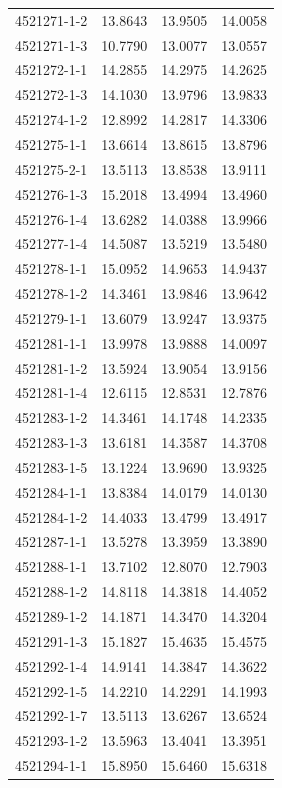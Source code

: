 \begin{longtable}{lrrr}
4521271-1-2 & 13.8643 & 13.9505 & 14.0058 \\
4521271-1-3 & 10.7790 & 13.0077 & 13.0557 \\
4521272-1-1 & 14.2855 & 14.2975 & 14.2625 \\
4521272-1-3 & 14.1030 & 13.9796 & 13.9833 \\
4521274-1-2 & 12.8992 & 14.2817 & 14.3306 \\
4521275-1-1 & 13.6614 & 13.8615 & 13.8796 \\
4521275-2-1 & 13.5113 & 13.8538 & 13.9111 \\
4521276-1-3 & 15.2018 & 13.4994 & 13.4960 \\
4521276-1-4 & 13.6282 & 14.0388 & 13.9966 \\
4521277-1-4 & 14.5087 & 13.5219 & 13.5480 \\
4521278-1-1 & 15.0952 & 14.9653 & 14.9437 \\
4521278-1-2 & 14.3461 & 13.9846 & 13.9642 \\
4521279-1-1 & 13.6079 & 13.9247 & 13.9375 \\
4521281-1-1 & 13.9978 & 13.9888 & 14.0097 \\
4521281-1-2 & 13.5924 & 13.9054 & 13.9156 \\
4521281-1-4 & 12.6115 & 12.8531 & 12.7876 \\
4521283-1-2 & 14.3461 & 14.1748 & 14.2335 \\
4521283-1-3 & 13.6181 & 14.3587 & 14.3708 \\
4521283-1-5 & 13.1224 & 13.9690 & 13.9325 \\
4521284-1-1 & 13.8384 & 14.0179 & 14.0130 \\
4521284-1-2 & 14.4033 & 13.4799 & 13.4917 \\
4521287-1-1 & 13.5278 & 13.3959 & 13.3890 \\
4521288-1-1 & 13.7102 & 12.8070 & 12.7903 \\
4521288-1-2 & 14.8118 & 14.3818 & 14.4052 \\
4521289-1-2 & 14.1871 & 14.3470 & 14.3204 \\
4521291-1-3 & 15.1827 & 15.4635 & 15.4575 \\
4521292-1-4 & 14.9141 & 14.3847 & 14.3622 \\
4521292-1-5 & 14.2210 & 14.2291 & 14.1993 \\
4521292-1-7 & 13.5113 & 13.6267 & 13.6524 \\
4521293-1-2 & 13.5963 & 13.4041 & 13.3951 \\
4521294-1-1 & 15.8950 & 15.6460 & 15.6318 \\

\end{longtable}
